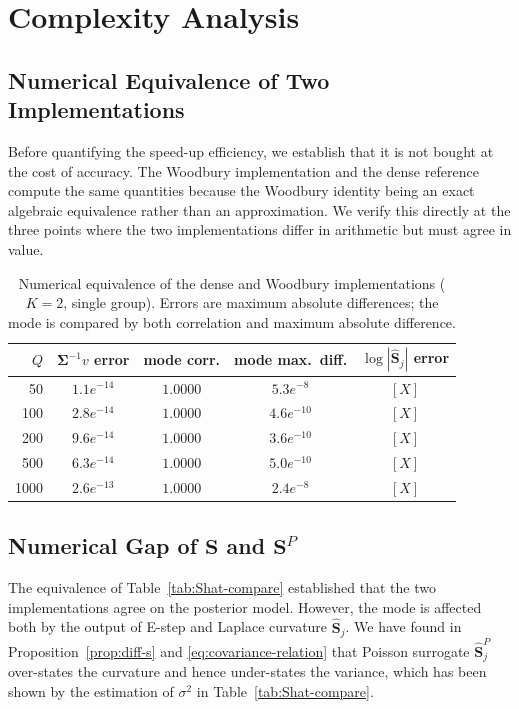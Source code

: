 \section{Complexity Analysis}
\label{sec:complexity-analysis}

\subsection*{Numerical Equivalence of Two Implementations}
\label{sec:equivalence}

Before quantifying the speed-up efficiency, we establish that it is not bought at the cost of accuracy.
The Woodbury implementation and the dense reference compute the same quantities because the
Woodbury identity being an exact algebraic equivalence rather than an approximation. We verify
this directly at the three points where the two implementations differ in arithmetic but must
agree in value.

\begin{table}[H]
\centering
\caption{Numerical equivalence of the dense and Woodbury implementations
($K=2$, single group). Errors are maximum absolute differences; the mode is
compared by both correlation and maximum absolute difference.}
\label{tab:equivalence}
\begin{tabular}{@{}rcccc@{}}
\toprule
$Q$ & $\bm\Sigma^{-1}v$ error & mode corr. & mode max.\ diff. & $\log|\widehat{\mathbf S}_j|$ error \\
\midrule
50   & $1.1e^{-14}$ & $1.0000$ & $5.3e^{-8}$ & $[X]$ \\
100  & $2.8e^{-14}$ & $1.0000$ & $4.6e^{-10}$ & $[X]$ \\
200  & $9.6e^{-14}$ & $1.0000$ & $3.6e^{-10}$ & $[X]$ \\
500  & $6.3e^{-14}$ & $1.0000$ & $5.0e^{-10}$ & $[X]$ \\
1000 & $2.6e^{-13}$ & $1.0000$ & $2.4e^{-8}$ & $[X]$ \\
\bottomrule
\end{tabular}
\end{table}

\subsection*{Numerical Gap of $\mathbf{S}$  and $\mathbf{S}^{P}$}
\label{sec:numerical gap}

The equivalence of Table~\ref{tab:Shat-compare} established that the two implementations agree on the posterior model. However, the mode is affected both by the output of E-step and Laplace curvature $\hat{\mathbf{S}}_{j}$. We have found in Proposition~\ref{prop:diff-s} and \eqref{eq:covariance-relation} that Poisson surrogate $\hat{\mathbf{S}}^{P}_{j}$ over-states the curvature and hence under-states the variance, which has been shown by the estimation of $\sigma^{2}$ in Table~\ref{tab:Shat-compare}. 

